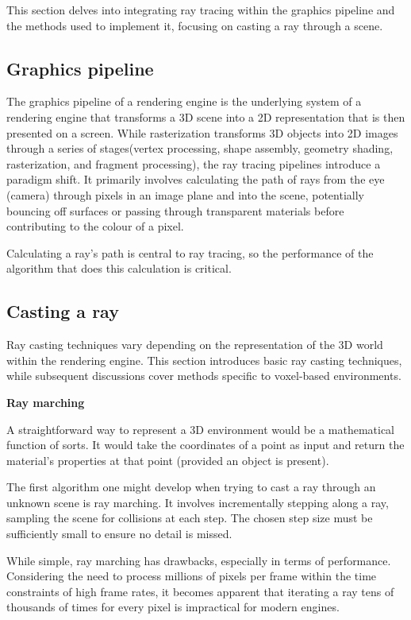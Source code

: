 This section delves into integrating ray tracing within the graphics pipeline and the methods used to implement it, focusing on casting a ray through a scene.

\subsection{Graphics pipeline}
The graphics pipeline of a rendering engine is the underlying system of a rendering engine that transforms a 3D scene into a 2D representation that is then presented on a screen. While rasterization transforms 3D objects into 2D images through a series of stages(vertex processing, shape assembly, geometry shading, rasterization, and fragment processing), the ray tracing pipelines introduce a paradigm shift. It primarily involves calculating the path of rays from the eye (camera) through pixels in an image plane and into the scene, potentially bouncing off surfaces or passing through transparent materials before contributing to the colour of a pixel.

Calculating a ray's path is central to ray tracing, so the performance of the algorithm that does this calculation is critical.
\subsection{Casting a ray}
Ray casting techniques vary depending on the representation of the 3D world within the rendering engine.
This section introduces basic ray casting techniques, while subsequent discussions cover methods specific to voxel-based environments.

\vspace{0.5cm}
\textbf{Ray marching}

A straightforward way to represent a 3D environment would be a mathematical function of sorts.
It would take the coordinates of a point as input and return the material's properties at that point (provided an object is present).

The first algorithm one might develop when trying to cast a ray through an unknown scene is ray marching.
It involves incrementally stepping along a ray, sampling the scene for collisions at each step.
The chosen step size must be sufficiently small to ensure no detail is missed.

While simple, ray marching has drawbacks, especially in terms of performance.
Considering the need to process millions of pixels per frame within the time constraints of high frame rates, it becomes apparent that iterating a ray tens of thousands of times for every pixel is impractical for modern engines.

